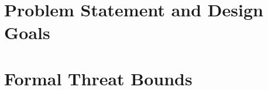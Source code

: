 \documentclass[../main]{subfiles}
\begin{document}
\section{Problem Statement and Design Goals}
\label{sec:problem_stmt}


\begin{problem}
\label{prob:main}
\end{problem}

\section{Formal Threat Bounds}
\label{sec:threat_bounds}


\begin{assumption}
\label{asm:grad_bound}
\end{assumption}

\begin{assumption}
\label{asm:honest_maj}
\end{assumption}
\end{document}
